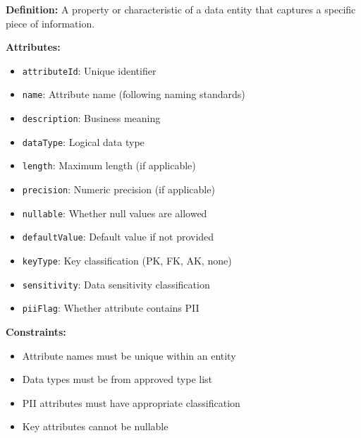 \documentclass[11pt,letterpaper]{article}
\begin{document}
\begin{definitionbox}
\textbf{Definition:} A property or characteristic of a data entity that captures a specific piece of information.

\textbf{Attributes:}
\begin{itemize}[nosep]
    \item \texttt{attributeId}: Unique identifier
    \item \texttt{name}: Attribute name (following naming standards)
    \item \texttt{description}: Business meaning
    \item \texttt{dataType}: Logical data type
    \item \texttt{length}: Maximum length (if applicable)
    \item \texttt{precision}: Numeric precision (if applicable)
    \item \texttt{nullable}: Whether null values are allowed
    \item \texttt{defaultValue}: Default value if not provided
    \item \texttt{keyType}: Key classification (PK, FK, AK, none)
    \item \texttt{sensitivity}: Data sensitivity classification
    \item \texttt{piiFlag}: Whether attribute contains PII
\end{itemize}

\textbf{Constraints:}
\begin{itemize}[nosep]
    \item Attribute names must be unique within an entity
    \item Data types must be from approved type list
    \item PII attributes must have appropriate classification
    \item Key attributes cannot be nullable
\end{itemize}
\end{definitionbox}
\end{document}
